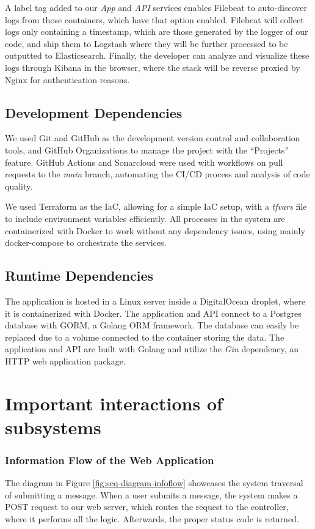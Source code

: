 \documentclass[12pt, a4paper, oneside]{book}
\begin{document}
A label tag added to our \textit{App} and \textit{API} services enables Filebeat to auto-discover logs from those containers, which have that option enabled. Filebeat will collect logs only containing a timestamp, which are those generated by the logger of our code, and ship them to Logstash where they will be further processed to be outputted to Elasticsearch.
Finally, the developer can analyze and visualize these logs through Kibana in the browser, where the stack will be reverse proxied by Nginx for authentication reasons. \bigskip

\subsection{Development Dependencies}
We used Git and GitHub as the development version control and collaboration tools, and GitHub Organizations to manage the project with the “Projects” feature. 
GitHub Actions and Sonarcloud were used with workflows on pull requests to the \textit{main} branch, automating the CI/CD process and analysis of code quality.\bigskip

We used Terraform as the IaC, allowing for a simple IaC setup, with a \textit{tfvars} file to include environment variables efficiently.
All processes in the system are containerized with Docker to work without any dependency issues, using mainly docker-compose to orchestrate the services.\bigskip


\subsection{Runtime Dependencies}
The application is hosted in a Linux server inside a DigitalOcean droplet, where it is containerized with Docker.
The application and API connect to a Postgres database with GORM, a Golang ORM framework.
The database can easily be replaced due to a volume connected to the container storing the data.
The application and API are built with Golang and utilize the \textit{Gin} dependency, an HTTP web application package.

\section{Important interactions of subsystems}

\subsubsection{Information Flow of the Web Application}
The diagram in Figure \ref{fig:seq-diagram-infoflow} showcases the system traversal of submitting a message.
When a user submits a message, the system makes a POST request to our web server, which routes the request to the controller, where it performs all the logic.
Afterwards, the proper status code is returned.
\end{document}
